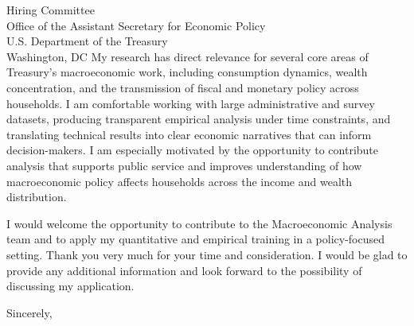 \documentclass[11pt,letterpaper]{letter}
\begin{document}
\begin{letter}{Hiring Committee \\
Office of the Assistant Secretary for Economic Policy \\
U.S. Department of the Treasury \\
Washington, DC}
My research has direct relevance for several core areas of Treasury’s macroeconomic work, including consumption dynamics, wealth concentration, and the transmission of fiscal and monetary policy across households. I am comfortable working with large administrative and survey datasets, producing transparent empirical analysis under time constraints, and translating technical results into clear economic narratives that can inform decision-makers. I am especially motivated by the opportunity to contribute analysis that supports public service and improves understanding of how macroeconomic policy affects households across the income and wealth distribution.

I would welcome the opportunity to contribute to the Macroeconomic Analysis team and to apply my quantitative and empirical training in a policy-focused setting. Thank you very much for your time and consideration. I would be glad to provide any additional information and look forward to the possibility of discussing my application.

\closing{Sincerely,}

\end{letter}
\end{document}
